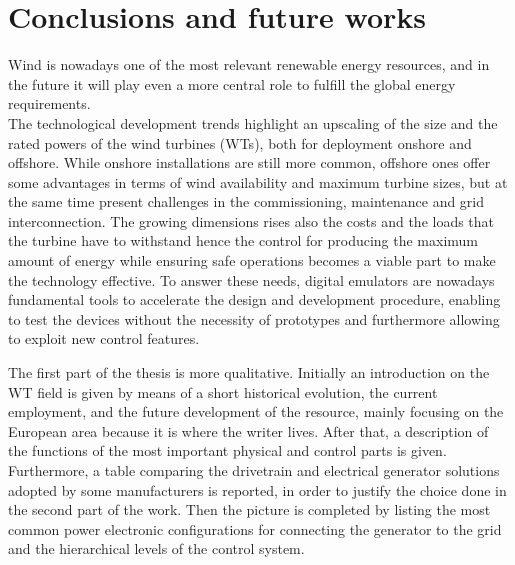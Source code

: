 \section{Conclusions and future works}\label{sec:c_conclusions}

Wind is nowadays one of the most relevant renewable energy resources, and in the future it will play even a more central role to fulfill the global energy requirements.\\
The technological development trends highlight an upscaling of the size and the rated powers of the wind turbines (WTs), both for deployment onshore and offshore. While onshore installations are still more common, offshore ones offer some advantages in terms of wind availability and maximum turbine sizes, but at the same time present challenges in the commissioning, maintenance and grid interconnection. The growing dimensions rises also the costs and the loads that the turbine have to withstand hence the control for producing the maximum amount of energy while ensuring safe operations becomes a viable part to make the technology effective. To answer these needs, digital emulators are nowadays fundamental tools to accelerate the design and development procedure, enabling to test the devices without the necessity of prototypes and furthermore allowing to exploit new control features. 

The first part of the thesis is more qualitative. Initially an introduction on the WT field is given by means of a short historical evolution, the current employment, and the future development of the resource, mainly focusing on the European area because it is where the writer lives. After that, a description of the functions of the most important physical and control parts is given. Furthermore, a table comparing the drivetrain and electrical generator solutions adopted by some manufacturers is reported, in order to justify the choice done in the second part of the work. Then the picture is completed by listing the most common power electronic configurations for connecting the generator to the grid and the hierarchical levels of the control system.   

